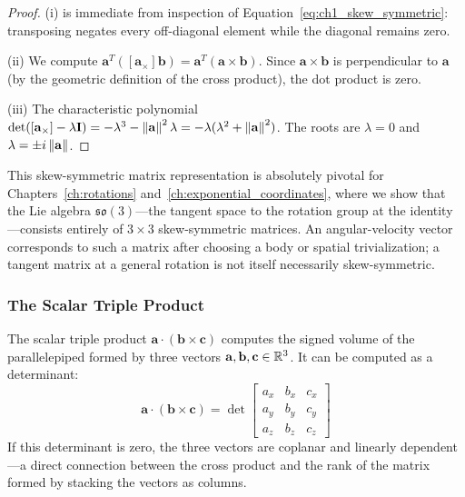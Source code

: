 \begin{proof}
(i) is immediate from inspection of Equation~\eqref{eq:ch1_skew_symmetric}: transposing negates every off-diagonal element while the diagonal remains zero.

(ii) We compute $\mathbf{a}^T ([\mathbf{a}_\times] \mathbf{b}) = \mathbf{a}^T (\mathbf{a} \times \mathbf{b})$. Since $\mathbf{a} \times \mathbf{b}$ is perpendicular to $\mathbf{a}$ (by the geometric definition of the cross product), the dot product is zero.

(iii) The characteristic polynomial $\det([\mathbf{a}_\times] - \lambda \mathbf{I}) = -\lambda^3 - \left\lVert \mathbf{a} \right\rVert^2 \lambda = -\lambda(\lambda^2 + \left\lVert \mathbf{a} \right\rVert^2)$. The roots are $\lambda = 0$ and $\lambda = \pm i\left\lVert \mathbf{a} \right\rVert$.
\end{proof}

This skew-symmetric matrix representation is absolutely pivotal for Chapters~\ref{ch:rotations} and~\ref{ch:exponential_coordinates}, where we show that the Lie algebra $\mathfrak{so}(3)$---the tangent space to the rotation group at the identity---consists entirely of $3 \times 3$ skew-symmetric matrices. An angular-velocity vector corresponds to such a matrix after choosing a body or spatial trivialization; a tangent matrix at a general rotation is not itself necessarily skew-symmetric.

\subsubsection{The Scalar Triple Product}

The scalar triple product $\mathbf{a} \cdot (\mathbf{b} \times \mathbf{c})$ computes the signed volume of the parallelepiped formed by three vectors $\mathbf{a}, \mathbf{b}, \mathbf{c} \in \mathbb{R}^3$. It can be computed as a determinant:
\begin{equation}
    \mathbf{a} \cdot (\mathbf{b} \times \mathbf{c}) = \det\begin{bmatrix} a_x & b_x & c_x \\ a_y & b_y & c_y \\ a_z & b_z & c_z \end{bmatrix}
\end{equation}
If this determinant is zero, the three vectors are coplanar and linearly dependent---a direct connection between the cross product and the rank of the matrix formed by stacking the vectors as columns.

